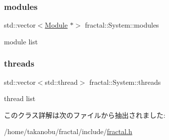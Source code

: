 \mbox{\label{classfractal_1_1System_ab458c473c6203ab1f82adb08cdada89a}} 
\subsubsection{\texorpdfstring{modules}{modules}}
{\footnotesize\ttfamily std\+::vector$<$\hyperlink{classfractal_1_1Module}{Module} $\ast$$>$ fractal\+::\+System\+::modules\hspace{0.3cm}{\ttfamily [private]}}



module list 

\mbox{\label{classfractal_1_1System_a6da1d544119f50d90f71cf7d4ba53007}} 
\subsubsection{\texorpdfstring{threads}{threads}}
{\footnotesize\ttfamily std\+::vector$<$std\+::thread$>$ fractal\+::\+System\+::threads\hspace{0.3cm}{\ttfamily [private]}}



thread list 



このクラス詳解は次のファイルから抽出されました\+:\begin{DoxyCompactItemize}
\item 
/home/takanobu/fractal/include/\hyperlink{fractal_8h}{fractal.\+h}\end{DoxyCompactItemize}
